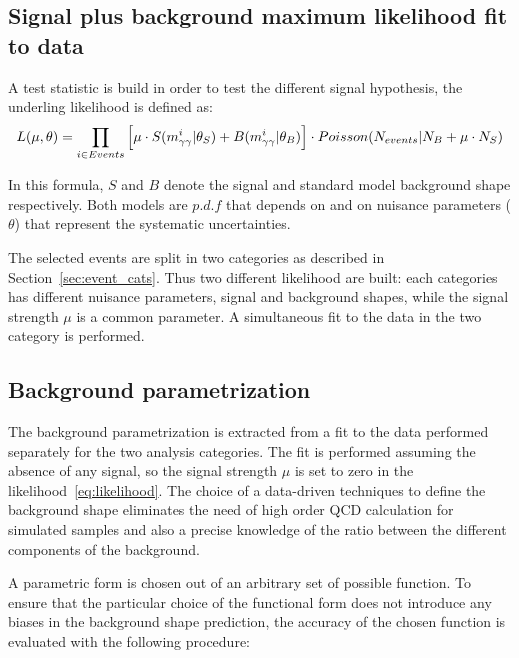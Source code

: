 \subsection{Signal plus background maximum likelihood fit to data}
A test statistic is build in order to test the different signal hypothesis, the underling likelihood
is defined as:
\begin{equation}
  \label{eq:likelihood}
  L(\mu, \theta) = \prod_{i\in Events}\Big[\mu\cdot S(m_{\gamma\gamma}^{i}|\theta_S) + B(m_{\gamma\gamma}^{i}|\theta_B)\Big]
  \cdot Poisson(N_{events}|N_B+\mu\cdot N_S)
\end{equation}

In this formula, $S$ and $B$ denote the signal and standard model background shape respectively. Both
models are $p.d.f$ that depends on \mgg and on nuisance parameters ($\theta$) that represent the systematic uncertainties.

The selected events are split in two categories as described in Section~\ref{sec:event_cats}.
Thus two different likelihood are built: each categories has different nuisance parameters, signal and background shapes,
while the signal strength $\mu $ is a common parameter.
A simultaneous fit to the data in the two category is performed.

\clearpage

\subsection{Background parametrization}
\label{sec:background}
The background parametrization is extracted from a fit to the data performed separately for the two analysis
categories. The fit is performed assuming the absence of any signal, so the signal strength $\mu$ is set
to zero in the likelihood~\ref{eq:likelihood}.
The choice of a data-driven techniques to define the background shape eliminates the need of high order
QCD calculation for simulated samples and also a precise knowledge of the ratio between the different
components of the background.

A parametric form is chosen out of an arbitrary set of possible function.
To ensure that the particular choice of the functional form does not introduce any biases in the
background shape prediction, the accuracy of the chosen function is evaluated with the following
procedure:

